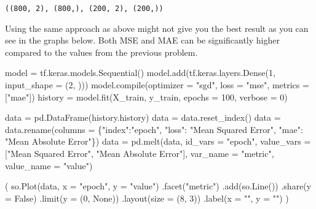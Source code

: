\documentclass[
  letterpaper,
  DIV=11,
  numbers=noendperiod]{scrreprt}
\newenvironment{Shaded}{\begin{snugshade}}{\end{snugshade}}
\newcommand{\BuiltInTok}[1]{\textcolor[rgb]{0.00,0.23,0.31}{#1}}
\newcommand{\DecValTok}[1]{\textcolor[rgb]{0.68,0.00,0.00}{#1}}
\newcommand{\NormalTok}[1]{\textcolor[rgb]{0.00,0.23,0.31}{#1}}
\newcommand{\OperatorTok}[1]{\textcolor[rgb]{0.37,0.37,0.37}{#1}}
\newcommand{\StringTok}[1]{\textcolor[rgb]{0.13,0.47,0.30}{#1}}
\newcommand{\VariableTok}[1]{\textcolor[rgb]{0.07,0.07,0.07}{#1}}
\begin{document}
\begin{verbatim}
((800, 2), (800,), (200, 2), (200,))
\end{verbatim}

Using the same approach as above might not give you the best result as
you can see in the graphs below. Both MSE and MAE can be significantly
higher compared to the values from the previous problem.

\begin{Shaded}
\begin{Highlighting}[]
\NormalTok{model }\OperatorTok{=}\NormalTok{ tf.keras.models.Sequential()}
\NormalTok{model.add(tf.keras.layers.Dense(}\DecValTok{1}\NormalTok{, input\_shape }\OperatorTok{=}\NormalTok{ (}\DecValTok{2}\NormalTok{, )))}
\NormalTok{model.}\BuiltInTok{compile}\NormalTok{(optimizer }\OperatorTok{=} \StringTok{"sgd"}\NormalTok{, loss }\OperatorTok{=} \StringTok{"mse"}\NormalTok{, metrics }\OperatorTok{=}\NormalTok{ [}\StringTok{"mae"}\NormalTok{])}
\NormalTok{history }\OperatorTok{=}\NormalTok{ model.fit(X\_train, y\_train, epochs }\OperatorTok{=} \DecValTok{100}\NormalTok{, verbose }\OperatorTok{=} \DecValTok{0}\NormalTok{)}

\NormalTok{data }\OperatorTok{=}\NormalTok{ pd.DataFrame(history.history)}
\NormalTok{data }\OperatorTok{=}\NormalTok{ data.reset\_index()}
\NormalTok{data }\OperatorTok{=}\NormalTok{ data.rename(columns }\OperatorTok{=}\NormalTok{ \{}\StringTok{"index"}\NormalTok{:}\StringTok{"epoch"}\NormalTok{, }
                              \StringTok{"loss"}\NormalTok{: }\StringTok{"Mean Squared Error"}\NormalTok{, }
                              \StringTok{"mae"}\NormalTok{: }\StringTok{"Mean Absolute Error"}\NormalTok{\})}
\NormalTok{data }\OperatorTok{=}\NormalTok{ pd.melt(data, }
\NormalTok{               id\_vars }\OperatorTok{=} \StringTok{"epoch"}\NormalTok{, }
\NormalTok{               value\_vars }\OperatorTok{=}\NormalTok{ [}\StringTok{"Mean Squared Error"}\NormalTok{, }\StringTok{"Mean Absolute Error"}\NormalTok{],}
\NormalTok{               var\_name }\OperatorTok{=} \StringTok{"metric"}\NormalTok{,}
\NormalTok{               value\_name }\OperatorTok{=} \StringTok{"value"}\NormalTok{)}

\NormalTok{(}
\NormalTok{    so.Plot(data, x }\OperatorTok{=} \StringTok{"epoch"}\NormalTok{, y }\OperatorTok{=} \StringTok{"value"}\NormalTok{)}
\NormalTok{    .facet(}\StringTok{"metric"}\NormalTok{)}
\NormalTok{    .add(so.Line())}
\NormalTok{    .share(y }\OperatorTok{=} \VariableTok{False}\NormalTok{)}
\NormalTok{    .limit(y }\OperatorTok{=}\NormalTok{ (}\DecValTok{0}\NormalTok{, }\VariableTok{None}\NormalTok{))}
\NormalTok{    .layout(size }\OperatorTok{=}\NormalTok{ (}\DecValTok{8}\NormalTok{, }\DecValTok{3}\NormalTok{))}
\NormalTok{    .label(x }\OperatorTok{=} \StringTok{""}\NormalTok{, y }\OperatorTok{=} \StringTok{""}\NormalTok{)}
\NormalTok{)}
\end{Highlighting}
\end{Shaded}
\end{document}
